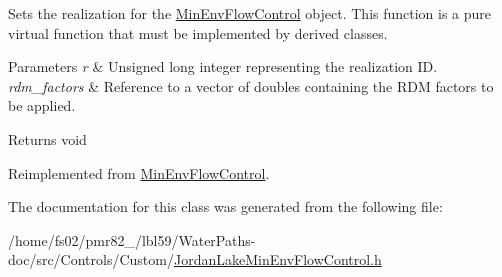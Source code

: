 Sets the realization for the {\ttfamily \mbox{\hyperlink{classMinEnvFlowControl}{Min\+Env\+Flow\+Control}}} object. This function is a pure virtual function that must be implemented by derived classes. 


\begin{DoxyParams}{Parameters}
{\em r} & Unsigned long integer representing the realization ID. \\
\hline
{\em rdm\+\_\+factors} & Reference to a vector of doubles containing the R\+DM factors to be applied.\\
\hline
\end{DoxyParams}
\begin{DoxyReturn}{Returns}
void 
\end{DoxyReturn}


Reimplemented from \mbox{\hyperlink{classMinEnvFlowControl_a630550c31f5c4e1a368289cbd5ab98ee}{Min\+Env\+Flow\+Control}}.



The documentation for this class was generated from the following file\+:\begin{DoxyCompactItemize}
\item 
/home/fs02/pmr82\+\_/lbl59/\+Water\+Paths-\/doc/src/\+Controls/\+Custom/\mbox{\hyperlink{JordanLakeMinEnvFlowControl_8h}{Jordan\+Lake\+Min\+Env\+Flow\+Control.\+h}}\end{DoxyCompactItemize}
